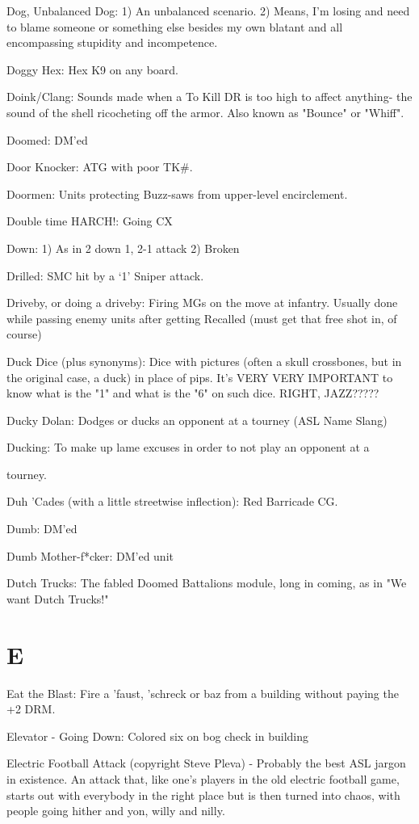 \documentclass[letterpaper]{article}
\begin{document}
Dog, Unbalanced Dog: 1) An unbalanced scenario. 2) Means, I'm losing and need to blame someone or something else besides my own blatant and all encompassing stupidity and incompetence.

Doggy Hex: Hex K9 on any board.

Doink/Clang: Sounds made when a To Kill DR is too high to affect anything- the sound of the shell ricocheting off the armor. Also known as "Bounce" or "Whiff".

Doomed: DM'ed

Door Knocker: ATG with poor TK\#.

Doormen: Units protecting Buzz-saws from upper-level encirclement.

Double time HARCH!: Going CX

Down: 1) As in 2 down 1, 2-1 attack 2) Broken

Drilled: SMC hit by a `1' Sniper attack.

Driveby, or doing a driveby: Firing MGs on the move at infantry.  Usually done while passing enemy units after getting Recalled (must get that free shot in, of course)

Duck Dice (plus synonyms): Dice with pictures (often a skull crossbones, but in the original case, a duck) in place of pips. It's VERY VERY IMPORTANT to know what is the "1" and what is the "6" on such dice. RIGHT, JAZZ?????

Ducky Dolan: Dodges or ducks an opponent at a tourney (ASL Name Slang)

Ducking: To make up lame excuses in order to not play an opponent at a

tourney.

Duh 'Cades (with a little streetwise inflection): Red Barricade CG.

Dumb: DM'ed

Dumb Mother-f*cker: DM'ed unit

Dutch Trucks: The fabled Doomed Battalions module, long in coming, as in "We want Dutch Trucks!"

\section{E}

Eat the Blast:  Fire a 'faust, 'schreck or baz from a building without paying the +2 DRM.

Elevator - Going Down:  Colored six on bog check in building

Electric Football Attack (copyright Steve Pleva) - Probably the best ASL jargon in existence. An attack that, like one's players in the old electric football game, starts out with everybody in the right place but is then turned into chaos, with people going hither and yon, willy and nilly.
\end{document}
